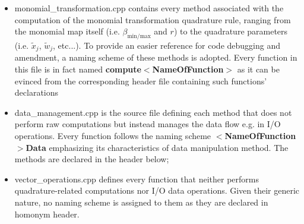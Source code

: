 \documentclass[a4paper, twosided]{book}
\begin{document}
\begin{itemize}
    \item \colorbox{poliGrayBlue}{monomial\_transformation.cpp} contains every method associated with the computation of the monomial transformation quadrature rule, ranging from the monomial map itself (i.e. $\beta_{\text{min/max}}$ and $r$) to the quadrature parameters (i.e. $\tilde{x}_j$, $\tilde{w}_j$, etc...). To provide an easier reference for code debugging and amendment, a naming scheme of these methods is adopted. Every function in this file is in fact named \color{poliDarkBlue} \textbf{compute}$\boldsymbol{<}$\textbf{NameOfFunction$\boldsymbol{>}$} \color{black} as it can be evinced from the corresponding header file containing such functions' declarations
    
    \vspace{0.2cm}
    
    \item \colorbox{poliGrayBlue}{data\_management.cpp} is the source file defining each method that does not perform raw computations but instead manages the data flow e.g. in I/O operations. Every function follows the naming scheme \color{poliDarkBlue} $\boldsymbol{<}$\textbf{NameOfFunction$\boldsymbol{>}$}\textbf{Data} \color{black} emphasizing its characteristics of data manipulation method. The methods are declared in the header below;

    \newpage
    \vspace{0.2cm}
    \vspace{0.3cm}
    
    \item \colorbox{poliGrayBlue}{vector\_operations.cpp} defines every function that neither performs quadrature-related computations nor I/O data operations. Given their generic nature, no naming scheme is assigned to them as they are declared in homonym header.
    
    \vspace{0.15cm}
\end{itemize}
\end{document}
